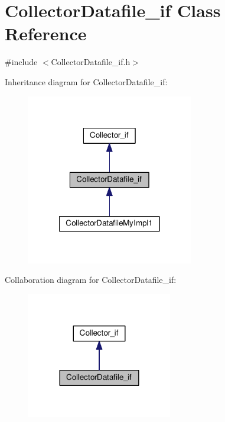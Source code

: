 \hypertarget{class_collector_datafile__if}{\section{Collector\-Datafile\-\_\-if Class Reference}
\label{class_collector_datafile__if}
}


{\ttfamily \#include $<$Collector\-Datafile\-\_\-if.\-h$>$}



Inheritance diagram for Collector\-Datafile\-\_\-if\-:\nopagebreak
\begin{figure}[H]
\begin{center}
\leavevmode
\includegraphics[width=206pt]{class_collector_datafile__if__inherit__graph}
\end{center}
\end{figure}


Collaboration diagram for Collector\-Datafile\-\_\-if\-:\nopagebreak
\begin{figure}[H]
\begin{center}
\leavevmode
\includegraphics[width=180pt]{class_collector_datafile__if__coll__graph}
\end{center}
\end{figure}
